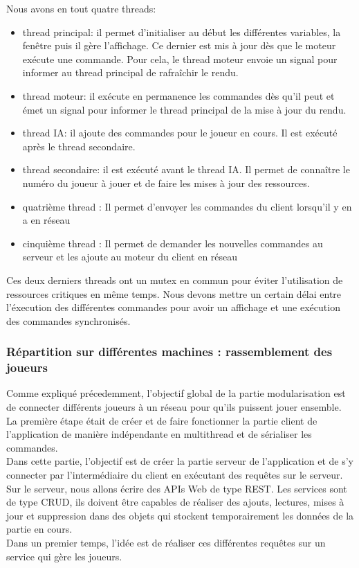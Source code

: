 \documentclass[12pt,a4paper]{article}
\begin{document}
Nous avons en tout quatre threads: 
\begin{itemize}
    \item thread principal: il permet d'initialiser au début les différentes variables, la fenêtre puis il gère l'affichage. Ce dernier est mis à jour dès que le moteur exécute une commande. Pour cela, le thread moteur envoie un signal pour informer au thread principal de rafraîchir le rendu.
    \item thread moteur: il exécute en permanence les commandes dès qu'il peut et émet un signal pour informer le thread principal de la mise à jour du rendu. 
    \item thread IA: il ajoute des commandes pour le joueur en cours. Il est exécuté après le thread secondaire.
    \item thread secondaire: il est exécuté avant le thread IA. Il permet de connaître le numéro du joueur à jouer et de faire les mises à jour des ressources.
    \item quatrième thread : Il permet d'envoyer les commandes du client lorsqu'il y en a en réseau
    \item cinquième thread : Il permet de demander les nouvelles commandes au serveur et les ajoute au moteur du client en réseau
\end{itemize}
Ces deux derniers threads ont un mutex en commun pour éviter l'utilisation de ressources critiques en même temps.
Nous devons mettre un certain délai entre l'éxecution des différentes commandes pour avoir un affichage et une exécution des commandes synchronisés.

\subsubsection{Répartition sur différentes machines : rassemblement des joueurs}
Comme expliqué précedemment, l'objectif global de la partie modularisation est de connecter différents joueurs à un réseau pour qu'ils puissent jouer ensemble. La première étape était de créer et de faire fonctionner la partie client de l'application de manière indépendante en multithread et de sérialiser les commandes. \\Dans cette partie, l'objectif est de créer la partie serveur de l'application et de s'y connecter par l'intermédiaire du client en exécutant des requêtes sur le serveur. Sur le serveur, nous allons écrire des APIs Web de type REST. Les services sont de type CRUD, ils doivent être capables de réaliser des ajouts, lectures, mises à jour et suppression dans des objets qui stockent temporairement les données de la partie en cours.\\Dans un premier temps, l'idée est de réaliser ces différentes requêtes sur un service qui gère les joueurs. 
\end{document}
